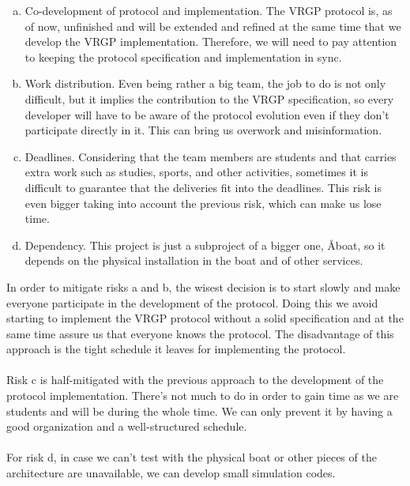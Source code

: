 \begin{enumerate}[a.]
	\item Co-development of protocol and implementation. The VRGP protocol is, as of now, unfinished and will be extended and refined at the same time that we develop the VRGP implementation. Therefore, we will need to pay attention to keeping the protocol specification and implementation in sync.
	\item Work distribution. Even being rather a big team, the job to do is not only difficult, but it implies the contribution to the VRGP specification, so every developer will have to be aware of the protocol evolution even if they don’t participate directly in it. This can bring us overwork and misinformation.
	\item Deadlines. Considering that the team members are students and that carries extra work such as studies, sports, and other activities, sometimes it is difficult to guarantee that the deliveries fit into the deadlines. This risk is even bigger taking into account the previous risk, which can make us lose time.
	\item Dependency. This project is just a subproject of a bigger one, Åboat, so it depends on the physical installation in the boat and of other services.
\end{enumerate}

\noindent
In order to mitigate risks a and b, the wisest decision is to start slowly and make everyone participate in the development of the protocol. Doing this we avoid starting to implement the VRGP protocol without a solid specification and at the same time assure us that everyone knows the protocol. The disadvantage of this approach is the tight schedule it leaves for implementing the protocol.
\\\\
Risk c is half-mitigated with the previous approach to the development of the protocol implementation. There’s not much to do in order to gain time as we are students and will be during the whole time. We can only prevent it by having a good organization and a well-structured schedule.
\\\\
For risk d, in case we can’t test with the physical boat or other pieces of the architecture are unavailable, we can develop small simulation codes.
